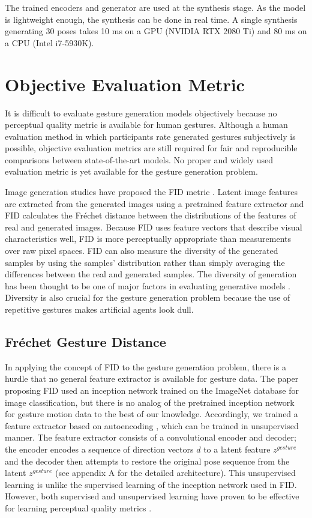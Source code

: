 \documentclass[acmtog]{acmart}
\begin{document}
The trained encoders and generator are used at the synthesis stage. As the model is lightweight enough, the synthesis can be done in real time. A single synthesis generating 30 poses takes 10 ms on a GPU (NVIDIA RTX 2080 Ti) and 80 ms on a CPU (Intel i7-5930K). \section{Objective Evaluation Metric} \label{sec:metric}
It is difficult to evaluate gesture generation models objectively because no perceptual quality metric is available for human gestures. Although a human evaluation method in which participants rate generated gestures subjectively is possible, objective evaluation metrics are still required for fair and reproducible comparisons between state-of-the-art models. No proper and widely used evaluation metric is yet available for the gesture generation problem. 

Image generation studies have proposed the FID metric \cite{heusel2017gans}. Latent image features are extracted from the generated images using a pretrained feature extractor and FID calculates the Fr\'{e}chet distance between the distributions of the features of real and generated images. Because FID uses feature vectors that describe visual characteristics well, FID is more perceptually appropriate than measurements over raw pixel spaces. FID can also measure the diversity of the generated samples by using the samples’ distribution rather than simply averaging the differences between the real and generated samples. The diversity of generation has been thought to be one of major factors in evaluating generative models \cite{borji2019pros}. Diversity is also crucial for the gesture generation problem because the use of repetitive gestures makes artificial agents look dull.

\subsection{Fr\'{e}chet Gesture Distance}
In applying the concept of FID to the gesture generation problem, there is a hurdle that no general feature extractor is available for gesture data. The paper proposing FID used an inception network trained on the ImageNet database for image classification, but there is no analog of the pretrained inception network for gesture motion data to the best of our knowledge. Accordingly, we trained a feature extractor based on autoencoding \cite{rumelhart1985learning}, which can be trained in unsupervised manner. The feature extractor consists of a convolutional encoder and decoder; the encoder encodes a sequence of direction vectors $d$ to a latent feature $z^{gesture}$ and the decoder then attempts to restore the original pose sequence from the latent $z^{gesture}$ (see appendix A for the detailed architecture). This unsupervised learning is unlike the supervised learning of the inception network used in FID. However, both supervised and unsupervised learning have proven to be effective for learning perceptual quality metrics \cite{zhang2018unreasonable}. 
\end{document}
